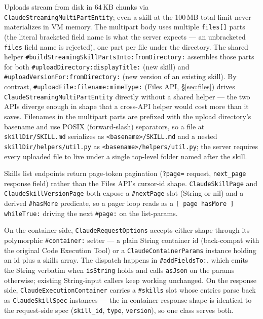 \documentclass[a4paper,10pt,fleqn]{article}
\newcommand{\cls}[1]{\texttt{#1}}
\newcommand{\sel}[1]{\texttt{\##1}}
\begin{document}
\begin{sloppypar}
Uploads stream from disk in 64\,KB chunks via
\cls{ClaudeStreamingMultiPartEntity}; even a skill at the 100\,MB
total limit never materializes in VM memory.  The multipart body
uses multiple \texttt{files[]} parts (the literal bracketed field
name is what the server expects --- an unbracketed \texttt{files}
field name is rejected), one part per file under the directory.
The shared helper \sel{buildStreamingSkillPartsInto:fromDirectory:}
assembles those parts for both \sel{uploadDirectory:displayTitle:}
(new skill) and \sel{uploadVersionFor:fromDirectory:} (new version
of an existing skill).  By contrast,
\sel{uploadFile:filename:mimeType:} (Files API,
\S\ref{sec:files}) drives \cls{ClaudeStreamingMultiPartEntity}
directly without a shared helper --- the two APIs diverge enough in
shape that a cross-API helper would cost more than it saves.
Filenames in the multipart parts are prefixed with the upload
directory's basename and use POSIX (forward-slash) separators, so a
file at \texttt{skillDir/SKILL.md} serializes as
\texttt{<basename>/SKILL.md} and a nested
\texttt{skillDir/helpers/util.py} as
\texttt{<basename>/helpers/util.py}; the server requires every
uploaded file to live under a single top-level folder named after
the skill.
\end{sloppypar}

Skills list endpoints return page-token pagination (\texttt{?page=}
request, \texttt{next\_page} response field) rather than the Files
API's cursor-id shape.  \cls{ClaudeSkillPage} and
\cls{ClaudeSkillVersionPage} both expose a \sel{nextPage} slot
(String or nil) and a derived \sel{hasMore} predicate, so a pager
loop reads as a \texttt{[ page hasMore ] whileTrue:} driving the
next \sel{page:} on the list-params.

\begin{sloppypar}
On the container side, \cls{ClaudeRequestOptions} accepts either
shape through its polymorphic \sel{container:} setter --- a plain
String container id (back-compat with the original Code Execution
Tool) or a \cls{ClaudeContainerParams} instance holding an id plus
a skills array.  The dispatch happens in \sel{addFieldsTo:}, which
emits the String verbatim when \texttt{isString} holds and calls
\texttt{asJson} on the params otherwise; existing String-input
callers keep working unchanged.  On the response side,
\cls{ClaudeExecutionContainer} carries a \sel{skills} slot whose
entries parse back as \cls{ClaudeSkillSpec} instances --- the
in-container response shape is identical to the request-side spec
(\texttt{skill\_id}, \texttt{type}, \texttt{version}), so one class
serves both.
\end{sloppypar}
\end{document}
